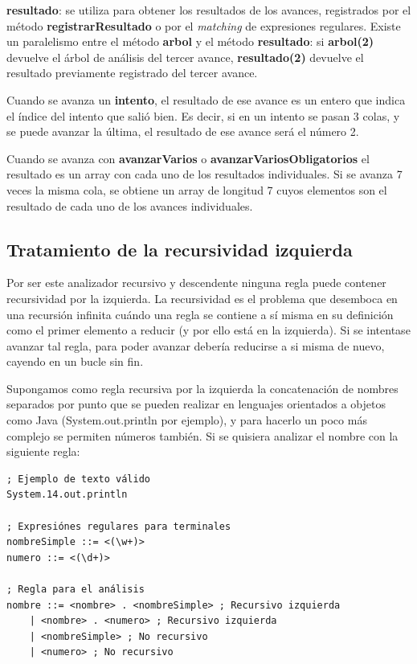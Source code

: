 \documentclass{report}
\begin{document}
	\vspace{10px}
	\noindent
	\textbf{resultado}: se utiliza para obtener los resultados de los avances, registrados por el método \textbf{registrarResultado} o por el \textit{matching} de expresiones regulares. Existe un paralelismo entre el método \textbf{arbol} y el método \textbf{resultado}: si \textbf{arbol(2)} devuelve el árbol de análisis del tercer avance, \textbf{resultado(2)} devuelve el resultado previamente registrado del tercer avance.

	\vspace{10px}
	
	Cuando se avanza un \textbf{intento}, el resultado de ese avance es un entero que indica el índice del intento que salió bien. Es decir, si en un intento se pasan 3 colas, y se puede avanzar la última, el resultado de ese avance será el número 2. 
	
	\vspace{10px}
	
	Cuando se avanza con \textbf{avanzarVarios} o \textbf{avanzarVariosObligatorios} el resultado es un array con cada uno de los resultados individuales. Si se avanza 7 veces la misma cola, se obtiene un array de longitud 7 cuyos elementos son el resultado de cada uno de los avances individuales. 
	

	\subsection{Tratamiento de la recursividad izquierda}
	
	Por ser este analizador recursivo y descendente ninguna regla puede contener recursividad por la izquierda. La recursividad es el problema que desemboca en una recursión infinita cuándo una regla se contiene a sí misma en su definición como el primer elemento a reducir (y por ello está en la izquierda). Si se intentase avanzar tal regla, para poder avanzar debería reducirse a si misma de nuevo, cayendo en un bucle sin fin.
	
	Supongamos como regla recursiva por la izquierda la concatenación de nombres separados por punto que se pueden realizar en lenguajes orientados a objetos como Java (System.out.println por ejemplo), y para hacerlo un poco más complejo se permiten números también. Si se quisiera analizar el nombre con la siguiente regla:
	
	
\begin{BVerbatim}
; Ejemplo de texto válido 
System.14.out.println

; Expresiónes regulares para terminales
nombreSimple ::= <(\w+)>
numero ::= <(\d+)>

; Regla para el análisis
nombre ::= <nombre> . <nombreSimple> ; Recursivo izquierda
	| <nombre> . <numero> ; Recursivo izquierda
	| <nombreSimple> ; No recursivo
	| <numero> ; No recursivo
\end{BVerbatim}	
\end{document}
